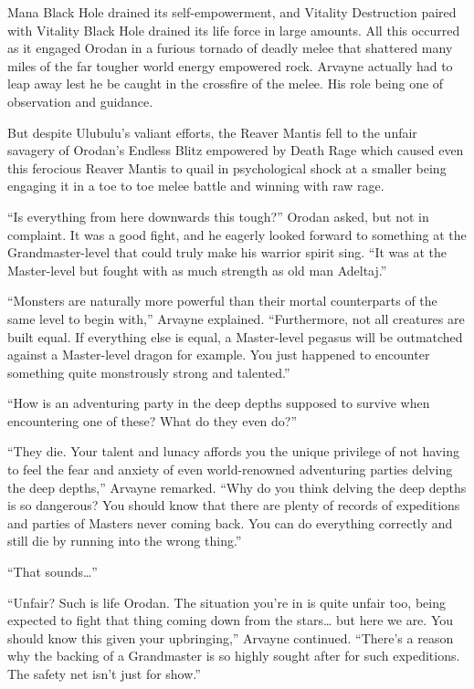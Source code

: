 \documentclass[a4paper,10pt]{book}
\begin{document}
Mana Black Hole drained its self-empowerment, and Vitality Destruction paired with Vitality Black Hole drained its life force in large amounts. All this occurred as it engaged Orodan in a furious tornado of deadly melee that shattered many miles of the far tougher world energy empowered rock. Arvayne actually had to leap away lest he be caught in the crossfire of the melee. His role being one of observation and guidance.\par
But despite Ulubulu’s valiant efforts, the Reaver Mantis fell to the unfair savagery of Orodan’s Endless Blitz empowered by Death Rage which caused even this ferocious Reaver Mantis to quail in psychological shock at a smaller being engaging it in a toe to toe melee battle and winning with raw rage.\par
“Is everything from here downwards this tough?” Orodan asked, but not in complaint. It was a good fight, and he eagerly looked forward to something at the Grandmaster-level that could truly make his warrior spirit sing. “It was at the Master-level but fought with as much strength as old man Adeltaj.”\par
“Monsters are naturally more powerful than their mortal counterparts of the same level to begin with,” Arvayne explained. “Furthermore, not all creatures are built equal. If everything else is equal, a Master-level pegasus will be outmatched against a Master-level dragon for example. You just happened to encounter something quite monstrously strong and talented.”\par
“How is an adventuring party in the deep depths supposed to survive when encountering one of these? What do they even do?”\par
“They die. Your talent and lunacy affords you the unique privilege of not having to feel the fear and anxiety of even world-renowned adventuring parties delving the deep depths,” Arvayne remarked. “Why do you think delving the deep depths is so dangerous? You should know that there are plenty of records of expeditions and parties of Masters never coming back. You can do everything correctly and still die by running into the wrong thing.”\par
“That sounds…”\par
“Unfair? Such is life Orodan. The situation you’re in is quite unfair too, being expected to fight that thing coming down from the stars… but here we are. You should know this given your upbringing,” Arvayne continued. “There’s a reason why the backing of a Grandmaster is so highly sought after for such expeditions. The safety net isn’t just for show.”\par
\end{document}
